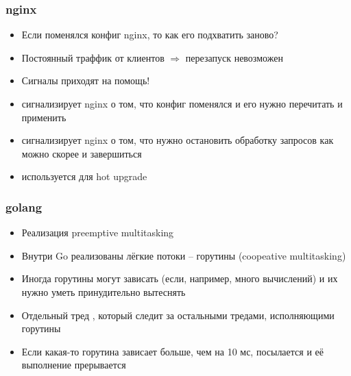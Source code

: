   \subsubsection{nginx}
    \begin{itemize}
      \item Если поменялся конфиг nginx, то как его подхватить заново?
      \item Постоянный траффик от клиентов $\Rightarrow$ перезапуск невозможен
      \item Сигналы приходят на помощь!
      \item {} сигнализирует nginx о том, что конфиг поменялся и его нужно перечитать и применить
      \item {} сигнализирует nginx о том, что нужно остановить обработку запросов как можно скорее и завершиться
      \item {} используется для hot upgrade
    \end{itemize}
  
  \subsubsection{golang}
    \begin{itemize}
      \item Реализация preemptive multitasking
      \item Внутри Go реализованы лёгкие потоки -- горутины (coopeative multitasking)
      \item Иногда горутины могут зависать (если, например, много вычислений) и их нужно уметь принудительно вытеснять
      \item Отдельный тред , который следит за остальными тредами, исполняющими горутины
      \item Если какая-то горутина зависает больше, чем на 10 мс, посылается  и её выполнение прерывается
    \end{itemize}
